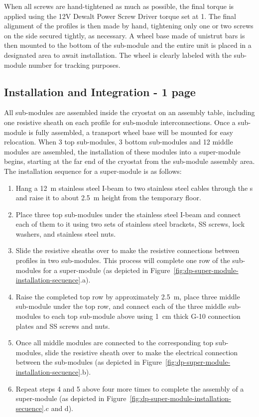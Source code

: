 When all screws are hand-tightened as much as possible, the final torque is applied using the 12V Dewalt Power Screw Driver torque set at 1.  The final alignment of the profiles is then made by hand, tightening only one or two screws on the side secured tightly, as necessary.
A wheel base made of unistrut bars is then mounted to the bottom of the sub-module and the entire unit is placed in a designated area to await installation.   The wheel is clearly labeled with the sub-module number for tracking purposes.

\subsection{Installation and Integration -  1 page}
\label{sec:fddp-hv-transport-install}
All  sub-modules are assembled inside the cryostat on an assembly table, including one resistive sheath on each profile for sub-module interconnections.
Once a sub-module is fully assembled, a transport wheel base will be mounted for easy relocation.
When \num{3} top sub-modules, \num{3} bottom sub-modules and \num{12} middle modules are assembled, the installation of these modules into a super-module begins, starting at the far end of the cryostat from the sub-module assembly area.
The installation sequence for a super-module is as follows:
\begin{enumerate}
    \item Hang a \SI{12}{\m} stainless steel I-beam to two stainless steel cables through the \fdth{}s and raise it to about \SI{2.5}{\m} height from the temporary floor.
    \item Place three top sub-modules under the stainless steel I-beam and connect each of them to it using two sets of stainless steel brackets, SS screws, lock washers, and stainless steel nuts.  
    \item Slide the resistive sheaths over to make the resistive connections between profiles in two sub-modules. This process will complete one row of the sub-modules for a super-module (as depicted in Figure~\ref{fig:dp-super-module-installation-secuence}.a).
    \item Raise the completed top row by approximately \SI{2.5}{\m}, place three middle sub-module under the top row, and connect each of the three middle sub-modules to each top sub-module above using \SI{1}{\cm} thick G-10 connection plates and SS screws and nuts.
    \item Once all middle modules are connected to the corresponding top sub-modules, slide the resistive sheath over to make the electrical connection between the sub-modules (as depicted in Figure~\ref{fig:dp-super-module-installation-secuence}.b).
    \item Repeat steps 4 and 5 above four more times to complete the assembly of a super-module (as depicted in Figure~\ref{fig:dp-super-module-installation-secuence}.c and d).
\end{enumerate}

